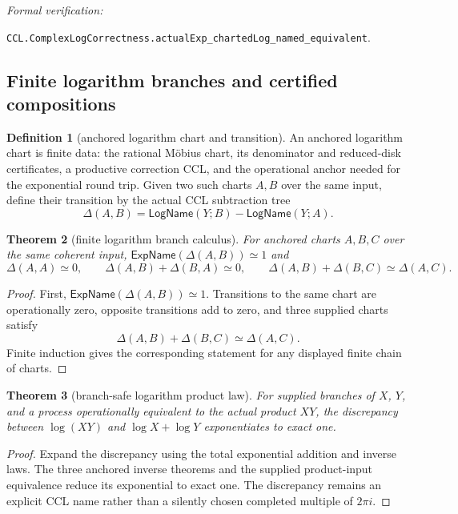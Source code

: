 \documentclass[10pt]{article}
\newtheorem{theorem}{Theorem}[section]
\theoremstyle{definition}
\newtheorem{definition}[theorem]{Definition}
\theoremstyle{remark}
\newcommand{\leanref}[1]{\par\smallskip\noindent
  \emph{Formal verification:}\par\nobreak
  {\raggedright\nolinkurl{#1}.\par}}
\begin{document}
\leanref{CCL.ComplexLogCorrectness.actualExp_chartedLog_named_equivalent}

\subsection{Finite logarithm branches and certified compositions}

\begin{definition}[anchored logarithm chart and transition]
An anchored logarithm chart is finite data: the rational M\"obius chart,
its denominator and reduced-disk certificates, a productive correction CCL,
and the operational anchor needed for the exponential round trip.  Given two
such charts $A,B$ over the same input, define their transition by the actual
CCL subtraction tree
\[
 \Delta(A,B)=\mathsf{LogName}(Y;B)-\mathsf{LogName}(Y;A).
 \tag{3.31i}
\]
\end{definition}

\begin{theorem}[finite logarithm branch calculus]
\label{thm:finite-log-branches}
For anchored charts $A,B,C$ over the same coherent input,
$\mathsf{ExpName}(\Delta(A,B))\simeq1$ and
\[
 \Delta(A,A)\simeq0,\qquad
 \Delta(A,B)+\Delta(B,A)\simeq0,\qquad
 \Delta(A,B)+\Delta(B,C)\simeq\Delta(A,C).
\]
\end{theorem}

\begin{proof}
First, $\mathsf{ExpName}(\Delta(A,B))\simeq1$.  Transitions to the same chart
are operationally zero, opposite transitions add to zero, and three supplied
charts satisfy
\[
 \Delta(A,B)+\Delta(B,C)\simeq\Delta(A,C).
 \tag{3.31j}
\]
Finite induction gives the corresponding statement for any displayed finite
chain of charts.
\end{proof}

\begin{theorem}[branch-safe logarithm product law]
For supplied branches of $X$, $Y$, and a process
operationally equivalent to the actual product $XY$, the discrepancy between
$\log(XY)$ and $\log X+\log Y$ exponentiates to exact one.
\end{theorem}

\begin{proof}
Expand the discrepancy using the total exponential addition and inverse
laws.  The three anchored inverse theorems and the supplied product-input
equivalence reduce its exponential to exact one.  The discrepancy remains an
explicit CCL name rather than a silently chosen completed multiple of
$2\pi i$.
\end{proof}
\end{document}
